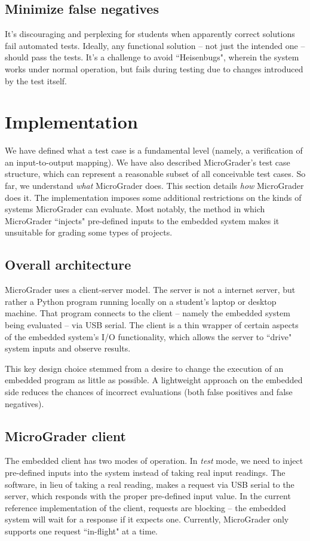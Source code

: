 \documentclass[12pt]{article}
\begin{document}
\subsection{Minimize false negatives}
It's discouraging and perplexing for students when apparently correct solutions fail automated tests.  Ideally, any functional solution -- not just the intended one -- should pass the tests.  It's a challenge to avoid ``Heisenbugs", wherein the system works under normal operation, but fails during testing due to changes introduced by the test itself.

\newpage
\section{Implementation}
We have defined what a test case is a fundamental level (namely, a verification of an input-to-output mapping).  We have also described MicroGrader's test case structure, which can represent a reasonable subset of all conceivable test cases.  So far, we understand \textit{what} MicroGrader does.  This section details \textit{how} MicroGrader does it.  The implementation imposes some additional restrictions on the kinds of systems MicroGrader can evaluate.  Most notably, the method in which MicroGrader ``injects" pre-defined inputs to the embedded system makes it unsuitable for grading some types of projects.

\subsection{Overall architecture}
\label{sec:architecture}
MicroGrader uses a client-server model.  The server is not a internet server, but rather a Python program running locally on a student's laptop or desktop machine.  That program connects to the client -- namely the embedded system being evaluated -- via USB serial.  The client is a thin wrapper of certain aspects of the embedded system's I/O functionality, which allows the server to ``drive" system inputs and observe results.

This key design choice stemmed from a desire to change the execution of an embedded program as little as possible.  A lightweight approach on the embedded side reduces the chances of incorrect evaluations (both false positives and false negatives).

\subsection{MicroGrader client}
The embedded client has two modes of operation.  In \textit{test} mode, we need to inject pre-defined inputs into the system instead of taking real input readings.  The software, in lieu of taking a real reading, makes a request via USB serial to the server, which responds with the proper pre-defined input value.  In the current reference implementation of the client, requests are blocking -- the embedded system will wait for a response if it expects one.  Currently, MicroGrader only supports one request ``in-flight" at a time.
\end{document}
